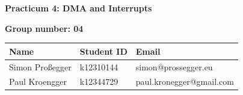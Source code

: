 \documentclass[11pt,a4paper]{article}
\begin{document}
\begin{center}
    {\LARGE \bfseries Practicum 4: DMA and Interrupts}
\end{center}

\vspace{0.5cm}
\textbf{Group number: 04 }

\begin{table}[h]
    \centering
    \begin{tabularx}{\textwidth}{|X|X|X|}
        \hline
        \centering \textbf{Name} & \centering \textbf{Student ID} & \centering \textbf{Email} \tabularnewline \hline
        Simon Proßegger & k12310144 & simon@prossegger.eu \tabularnewline \hline
        Paul Kroengger & k12344729 & paul.kronegger@gmail.com \tabularnewline \hline
    \end{tabularx}
\end{table}


\newpage

\newpage

\newpage

\newpage

\newpage
\end{document}
